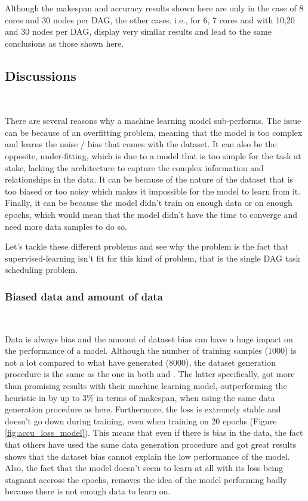 Although the makespan and accuracy results shown here are only 
in the case of 8 cores and 30 nodes per DAG,
the other cases, i.e., for 6, 7 cores and with 10,20 and 30 nodes per DAG,
display very similar results and lead to the same conclusions as those
shown here.

\subsection{Discussions}
~

There are several reasons why a machine learning model
sub-performs.
The issue can be because of an overfitting problem,
meaning that the model is too complex and learns the noise / bias
that comes with the dataset.
It can also be the opposite, under-fitting, 
which is due to a model that is too simple for the task at stake,
lacking the architecture to capture the complex information and 
relationships
in the data.
It can be because of the nature of the dataset that is too biased
or too noisy which makes it impossible for the model to learn from it.
Finally, it can be because the model didn't train on enough data 
or on enough epochs, which would mean that the model didn't have
the time to converge and need more data samples to do so.

Let's tackle these different problems and see why 
the problem is the fact that supervised-learning isn't fit for this kind of problem,
that is the single DAG task scheduling problem.


\subsubsection{Biased data and amount of data}
~

Data is always bias and the amount of dataset bias\cite{torralba2011biasdataset}
can have a huge impact on the performance of a model.
Although the number of training samples (1000) is not a lot 
compared to what \citet{Lee2021GlobalDagSchedDRL} have generated (8000),
the dataset generation procedure is the same as the one 
in both \citet{zhao2020DAGsched} and \citet{Lee2021GlobalDagSchedDRL}.
The latter specifically, got more than promising results with their machine learning model,
outperforming the heuristic in \citet{zhao2020DAGsched} by up to 3\% in terms of makespan,
 when using the same data generation procedure as here.
Furthermore, the loss is extremely stable and doesn't go down
during training, even when training on 20 epochs (Figure \ref{fig:accu_loss_model}).
This means that even if there is bias in the data, the fact that others have used
the same data generation procedure and got great results shows that the
dataset bias cannot explain the low performance of the model.
Also, the fact that the model doesn't seem to learn at all with 
its loss being stagnant accross the epochs, removes the 
idea of the model performing badly because there is not enough data to learn on.



